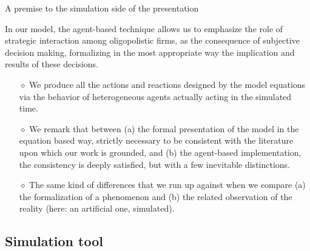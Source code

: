 \documentclass[9pt]{beamer}
\begin{document}
\begin{frame}{A premise to the simulation side of the presentation}

In our model, the agent-based technique allows us to emphasize the role of strategic interaction among oligopolistic firms, as the consequence of subjective decision making, formalizing in the most appropriate way the implication and results of these decisions. 

\begin{itemize}

\item[$\diamond$] We produce all the actions and reactions designed by the model equations via the behavior of heterogeneous agents actually acting in the simulated time. 

\item[$\diamond$] We remark that between (a) the formal presentation of the model in the equation based way, strictly necessary to be consistent with the literature upon which our work is grounded, and (b) the agent-based implementation, the consistency is deeply satisfied, but with a few inevitable distinctions. 

\item[$\diamond$] The same kind of differences that we run up against when we compare (a) the formalization of a phenomenon and (b) the related observation of the reality (here: an artificial one, simulated).

\end{itemize}

\end{frame}

\subsection{Simulation tool}
\end{document}
